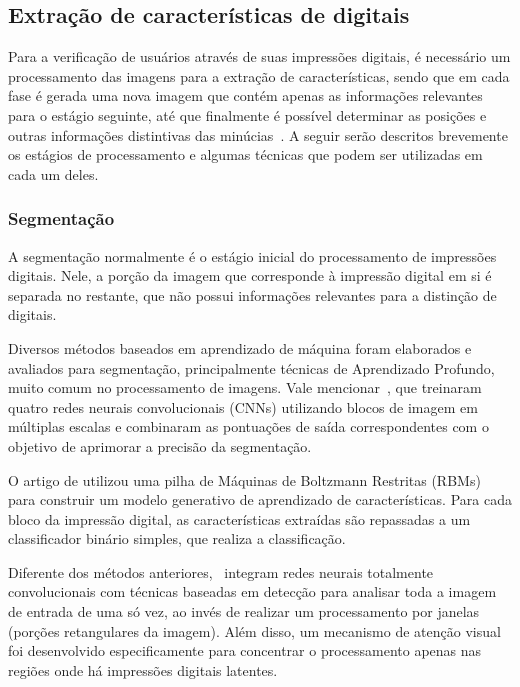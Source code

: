 \subsection{Extração de características de digitais}\label{subsec:extracao_de_caracteristicas}

Para a verificação de usuários através de suas impressões digitais, é necessário um processamento das imagens para a extração de características, sendo que em cada fase é gerada uma nova imagem que contém apenas as informações relevantes para o estágio seguinte, até que finalmente é possível determinar as posições e outras informações distintivas das minúcias~\cite{Maltoni20221}. A seguir serão descritos brevemente os estágios de processamento e algumas técnicas que podem ser utilizadas em cada um deles.

\subsubsection{Segmentação}\label{subsubsec:segmentacao}

A segmentação normalmente é o estágio inicial do processamento de impressões digitais. Nele, a porção da imagem que corresponde à impressão digital em si é separada no restante, que não possui informações relevantes para a distinção de digitais. 

Diversos métodos baseados em aprendizado de máquina foram elaborados e avaliados para segmentação, principalmente técnicas de Aprendizado Profundo, muito comum no processamento de imagens. Vale mencionar~, que treinaram quatro redes neurais convolucionais (CNNs) utilizando blocos de imagem em múltiplas escalas e combinaram as pontuações de saída correspondentes com o objetivo de aprimorar a precisão da segmentação.

O artigo de  utilizou uma pilha de Máquinas de Boltzmann Restritas (RBMs) para construir um modelo generativo de aprendizado de características. Para cada bloco da impressão digital, as características extraídas são repassadas a um classificador binário simples, que realiza a classificação.

Diferente dos métodos anteriores,~ integram redes neurais totalmente convolucionais com técnicas baseadas em detecção para analisar toda a imagem de entrada de uma só vez, ao invés de realizar um processamento por janelas (porções retangulares da imagem). Além disso, um mecanismo de atenção visual foi desenvolvido especificamente para concentrar o processamento apenas nas regiões onde há impressões digitais latentes.

